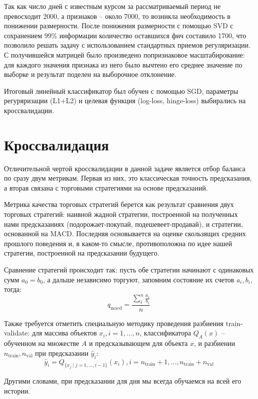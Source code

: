 \documentclass[pdftex,ptm,14pt,a4paper]{report}
\begin{document}
Так как число дней с известным курсом за рассматриваемый период не превосходит 2000, а признаков -- около 7000, то возникла
необходимость в понижении размерности. После понижения размерности с помощью SVD\cite{svd} с сохранением
99\% информации количество оставшихся фич составило 1700, что позволило решать задачу с использованием стандартных
приемов регуляризации. С получившейся матрицей было произведено попризнаковое
масштабирование: для каждого значения признака из него было вычтено его среднее значение по выборке и результат поделен на
выборочное отклонение.

Итоговый линейный классификатор был обучен с помощью SGD\cite{sgd}, параметры регуряризации (L1+L2) и целевая функция (log-loss, hinge-loss) выбирались на кроссвалидации.

\section{Кроссвалидация}

Отличительной чертой кроссвалидации в данной задаче является отбор баланса по сразу двум метрикам. Первая из них, это
классическая точность предсказания, а вторая связана с торговыми стратегиями на основе предсказаний. 

Метрика качества торговых стратегий берется как результат сравнения двух торговых стратегий: наивной жадной стратегии, построенной на полученных нами предсказаниях (подорожает-покупай, подешевеет-продавай), и стратегии, основанной на MACD\cite{macd}. Последняя основывается на оценке скользящих средних прошлого поведения и, в каком-то смысле, противоположна по идее нашей стратегии,
построенной на предсказании будущего.

Сравнение стратегий происходит так: пусть обе стратегии начинают с одинаковых сумм $a_0 = b_0$, а дальше независимо
торгуют, запомним состояние их счетов $a_i, b_i$, тогда:
\[ q_\text{macd} = \frac{\sum_i^n \frac{a_i}{b_i}}{n} \]

Также требуется отметить специальную методику проведения разбиения train-validate: для массива объектов $x_i, i=1,\ldots,n$, классификатора $Q_A(x)$ -- обученном на множестве $A$ и предсказывающем для объекта $x$, 
и разбиении $n_\text{train}, n_\text{val}$ при предсказании $\hat{y}_i$:
\[ \hat{y}_i = Q_{\{x_j \mid j=1,\ldots,i-1\}}(x_i), i=n_\text{train}+1,\ldots,n_\text{train} + n_\text{val} \]

Другими словами, при предсказании для дня мы всегда обучаемся на всей его истории.
\end{document}
